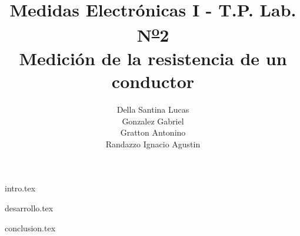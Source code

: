 

\title{ Medidas Electrónicas I - T.P. Lab. N\textsuperscript{\underline{o}}2\\
        Medición de la resistencia de un conductor  
      }
\author{
        Della Santina Lucas \\
        Gonzalez Gabriel \\
        Gratton Antonino \\
        Randazzo Ignacio Agustin\\
        }


\maketitle
\tableofcontents

{intro.tex}

{desarrollo.tex}

{conclusion.tex}


